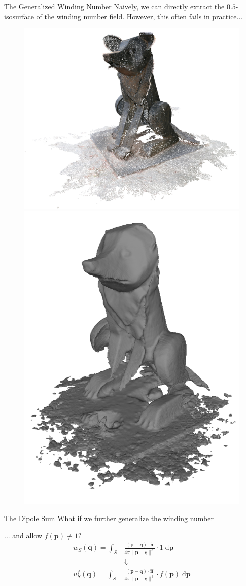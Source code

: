 \documentclass[10pt]{beamer}
\newcommand{\bp}{\mathbf{p}}
\newcommand{\bq}{\mathbf{q}}
\newcommand{\bn}{\mathbf{n}}
\begin{document}
\begin{frame}{The \alert{Generalized} Winding Number}
    Naively, we can directly extract the \(0.5\)-isosurface of the winding number field. However, this often fails in practice...
    \begin{figure}
        \centering
        \hspace{-2em}\includegraphics[width=0.48\linewidth]{figures/intro/point_cloud.png}
        \includegraphics[width=0.3\linewidth]{figures/wn/gwn_mesh.png}
    \end{figure}
\end{frame}


\begin{frame}{The Dipole Sum}
    What if we further generalize the winding number

    ... and allow \(f(\bp) \not\equiv 1\)?
    \begin{align*}
        w_S(\bq) = \int_{S}   & \frac{(\bp - \bq) \cdot \widehat{\bn}}{4\pi \|\bp - \bq\|^3} \cdot 1 \;\mathrm{d}\bp      \\
                              & \Downarrow                                                                                \\
        u^f_S(\bq) = \int_{S} & \frac{(\bp - \bq) \cdot \widehat{\bn}}{4\pi \|\bp - \bq\|^3} \cdot f(\bp) \;\mathrm{d}\bp
    \end{align*}
\end{frame}
\end{document}
